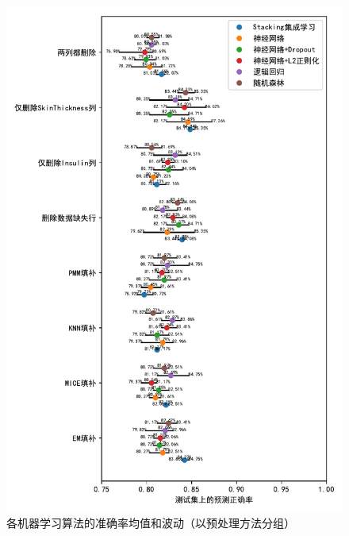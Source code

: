 \documentclass[a4paper]{ctexart}
\begin{document}
\begin{figure}[htbp]
	\centering
	\includegraphics[width=\textwidth]{figure/f4.pdf}
	\caption{各机器学习算法的准确率均值和波动（以预处理方法分组）}
	\label{figure:网络数据集正确率}
\end{figure}

\newpage
\end{document}
